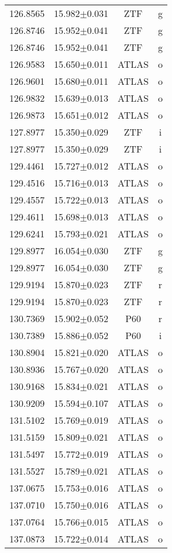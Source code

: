 \begin{table}
\begin{tabular}{cccc}
126.8565 & 15.982$\pm$0.031 & ZTF & g \\
126.8746 & 15.952$\pm$0.041 & ZTF & g \\
126.8746 & 15.952$\pm$0.041 & ZTF & g \\
126.9583 & 15.650$\pm$0.011 & ATLAS & o \\
126.9601 & 15.680$\pm$0.011 & ATLAS & o \\
126.9832 & 15.639$\pm$0.013 & ATLAS & o \\
126.9873 & 15.651$\pm$0.012 & ATLAS & o \\
127.8977 & 15.350$\pm$0.029 & ZTF & i \\
127.8977 & 15.350$\pm$0.029 & ZTF & i \\
129.4461 & 15.727$\pm$0.012 & ATLAS & o \\
129.4516 & 15.716$\pm$0.013 & ATLAS & o \\
129.4557 & 15.722$\pm$0.013 & ATLAS & o \\
129.4611 & 15.698$\pm$0.013 & ATLAS & o \\
129.6241 & 15.793$\pm$0.021 & ATLAS & o \\
129.8977 & 16.054$\pm$0.030 & ZTF & g \\
129.8977 & 16.054$\pm$0.030 & ZTF & g \\
129.9194 & 15.870$\pm$0.023 & ZTF & r \\
129.9194 & 15.870$\pm$0.023 & ZTF & r \\
130.7369 & 15.902$\pm$0.052 & P60 & r \\
130.7389 & 15.886$\pm$0.052 & P60 & i \\
130.8904 & 15.821$\pm$0.020 & ATLAS & o \\
130.8936 & 15.767$\pm$0.020 & ATLAS & o \\
130.9168 & 15.834$\pm$0.021 & ATLAS & o \\
130.9209 & 15.594$\pm$0.107 & ATLAS & o \\
131.5102 & 15.769$\pm$0.019 & ATLAS & o \\
131.5159 & 15.809$\pm$0.021 & ATLAS & o \\
131.5497 & 15.772$\pm$0.019 & ATLAS & o \\
131.5527 & 15.789$\pm$0.021 & ATLAS & o \\
137.0675 & 15.753$\pm$0.016 & ATLAS & o \\
137.0710 & 15.750$\pm$0.016 & ATLAS & o \\
137.0764 & 15.766$\pm$0.015 & ATLAS & o \\
137.0873 & 15.722$\pm$0.014 & ATLAS & o \\

\end{tabular}
\end{table}
